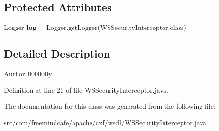 \subsection*{Protected Attributes}
\begin{DoxyCompactItemize}
\item 
\hypertarget{classcom_1_1freemindcafe_1_1apache_1_1cxf_1_1wsdl_1_1_w_s_security_interceptor_a3aed5c567ecbda5158b87a5b5db38d57}{}Logger {\bfseries log} = Logger.\+get\+Logger(W\+S\+Security\+Interceptor.\+class)\label{classcom_1_1freemindcafe_1_1apache_1_1cxf_1_1wsdl_1_1_w_s_security_interceptor_a3aed5c567ecbda5158b87a5b5db38d57}

\end{DoxyCompactItemize}


\subsection{Detailed Description}
\begin{DoxyAuthor}{Author}
li00000y 
\end{DoxyAuthor}


Definition at line 21 of file W\+S\+Security\+Interceptor.\+java.



The documentation for this class was generated from the following file\+:\begin{DoxyCompactItemize}
\item 
src/com/freemindcafe/apache/cxf/wsdl/W\+S\+Security\+Interceptor.\+java\end{DoxyCompactItemize}
